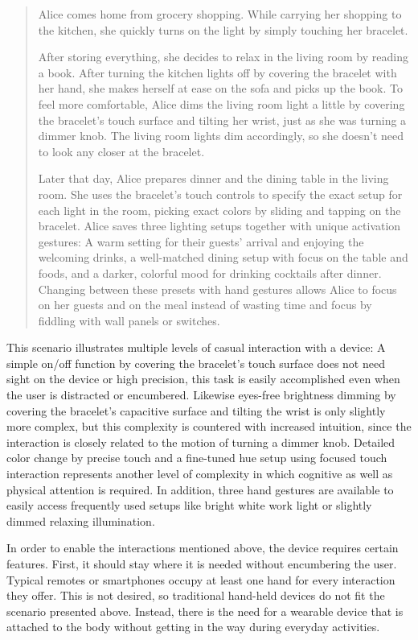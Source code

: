 \begin{quotation}
	Alice comes home from grocery shopping. While carrying her shopping to the kitchen, she quickly turns on the light by simply touching her bracelet.
	
	After storing everything, she decides to relax in the living room by reading a book. After turning the kitchen lights off by covering the bracelet with her hand, she makes herself at ease on the sofa and picks up the book. To feel more comfortable, Alice dims the living room light a little by covering the bracelet's touch surface and tilting her wrist, just as she was turning a dimmer knob. The living room lights dim accordingly, so she doesn't need to look any closer at the bracelet.
	
	Later that day, Alice prepares dinner and the dining table in the living room. She uses the bracelet's touch controls to specify the exact setup for each light in the room, picking exact colors by sliding and tapping on the bracelet. Alice saves three lighting setups together with unique activation gestures: A warm setting for their guests' arrival and enjoying the welcoming drinks, a well-matched dining setup with focus on the table and foods, and a darker, colorful mood for drinking cocktails after dinner. Changing between these presets with hand gestures allows Alice to focus on her guests and on the meal instead of wasting time and focus by fiddling with wall panels or switches.
	\end{quotation}
	
This scenario illustrates multiple levels of casual interaction with a device: A simple on/off function by covering the bracelet's touch surface does not need sight on the device or high precision, this task is easily accomplished even when the user is distracted or encumbered. Likewise eyes-free brightness dimming by covering the bracelet's capacitive surface and tilting the wrist is only slightly more complex, but this complexity is countered with increased intuition, since the interaction is closely related to the motion of turning a dimmer knob. Detailed color change by precise touch and a fine-tuned hue setup using focused touch interaction represents another level of complexity in which cognitive as well as physical attention is required. In addition, three hand gestures are available to easily access frequently used setups like bright white work light or slightly dimmed relaxing illumination.

In order to enable the interactions mentioned above, the device requires certain features. First, it should stay where it is needed without encumbering the user. Typical remotes or smartphones occupy at least one hand for every interaction they offer. This is not desired, so traditional hand-held devices do not fit the scenario presented above. Instead, there is the need for a wearable device that is attached to the body without getting in the way during everyday activities.

